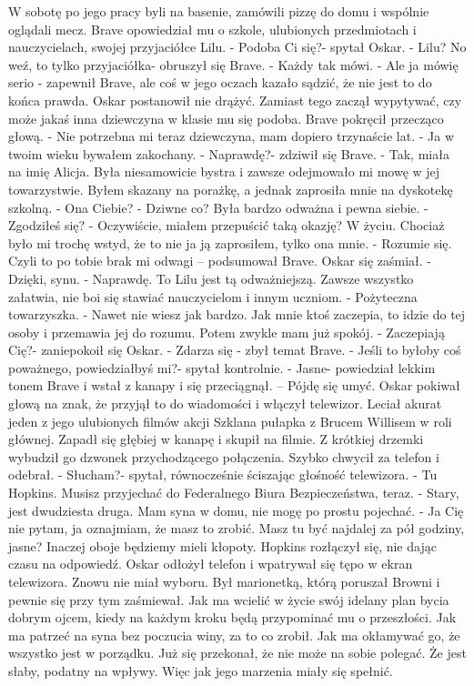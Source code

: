 \documentclass[12pt,a4paper]{book}
\begin{document}
W sobotę po jego pracy byli na basenie, zamówili pizzę do domu i wspólnie oglądali mecz. Brave opowiedział mu o szkole, ulubionych przedmiotach i nauczycielach, swojej przyjaciółce Lilu. 
- Podoba Ci się?- spytał Oskar. 
- Lilu? No weź, to tylko przyjaciółka- obruszył się Brave. 
- Każdy tak mówi.
- Ale ja mówię serio - zapewnił Brave, ale coś w jego oczach kazało sądzić, że nie jest to do końca prawda. 
Oskar postanowił nie drążyć. Zamiast tego zaczął wypytywać, czy może jakaś inna dziewczyna w klasie mu się podoba. Brave pokręcił przecząco głową.
- Nie potrzebna mi teraz dziewczyna, mam dopiero trzynaście lat. 
- Ja w twoim wieku bywałem zakochany.
- Naprawdę?- zdziwił się Brave. 
- Tak, miała na imię Alicja. Była niesamowicie bystra i zawsze odejmowało mi mowę w jej towarzystwie. Byłem skazany na porażkę, a jednak zaprosiła mnie na dyskotekę szkolną. 
- Ona Ciebie?
- Dziwne co? Była bardzo odważna i pewna siebie. 
- Zgodziłeś się?
- Oczywiście, miałem przepuścić taką okazję? W życiu. Chociaż było mi trochę wstyd, że to nie ja ją zaprosiłem, tylko ona mnie. 
- Rozumie się. Czyli to po tobie brak mi odwagi – podsumował Brave.
Oskar się zaśmiał.
- Dzięki, synu.
- Naprawdę. To Lilu jest tą odważniejszą. Zawsze wszystko załatwia, nie boi się stawiać nauczycielom i innym uczniom. 
- Pożyteczna towarzyszka. 
- Nawet nie wiesz jak bardzo. Jak mnie ktoś zaczepia, to idzie do tej osoby i przemawia jej do rozumu. Potem zwykle mam już spokój.
- Zaczepiają Cię?- zaniepokoił się Oskar. 
- Zdarza się -  zbył temat Brave. 
- Jeśli to byłoby coś poważnego, powiedziałbyś mi?- spytał kontrolnie. 
- Jasne- powiedział lekkim tonem Brave i wstał z kanapy i się przeciągnął. – Pójdę się umyć. 
Oskar pokiwał głową na znak, że przyjął to do wiadomości i włączył telewizor. Leciał akurat jeden z jego ulubionych filmów akcji Szklana pułapka z Brucem Willisem w roli głównej. Zapadł się głębiej w kanapę i skupił na filmie.
Z krótkiej drzemki wybudził go dzwonek przychodzącego połączenia. Szybko chwycił za telefon i odebrał. 
- Słucham?- spytał, równocześnie ściszając głośność telewizora.
- Tu Hopkins. Musisz przyjechać do Federalnego Biura Bezpieczeństwa, teraz.
- Stary, jest dwudziesta druga. Mam syna w domu, nie mogę po prostu pojechać. 
- Ja Cię nie pytam, ja oznajmiam, że masz to zrobić. Masz tu być najdalej za pół godziny, jasne? Inaczej oboje będziemy mieli kłopoty. 
Hopkins rozłączył się, nie dając czasu na odpowiedź. 
Oskar odłożył telefon i wpatrywał się tępo w ekran telewizora. Znowu nie miał wyboru. Był marionetką, którą poruszał Browni i pewnie się przy tym zaśmiewał. Jak ma wcielić  w życie swój idelany plan bycia dobrym ojcem, kiedy na każdym kroku będą przypominać mu o przeszłości. Jak ma patrzeć na syna bez poczucia winy, za to co zrobił. Jak ma okłamywać go, że wszystko jest w porządku. Już się przekonał, że nie może na sobie polegać. Że jest słaby, podatny na wpływy. Więc jak jego marzenia miały się spełnić. 
\end{document}
